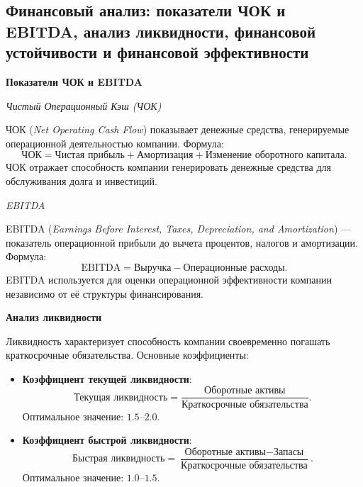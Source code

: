 \pagebreak
\subsection{Финансовый анализ: показатели ЧОК и EBITDA, анализ ликвидности, финансовой устойчивости и финансовой эффективности}

\textbf{Показатели ЧОК и EBITDA}

\textit{Чистый Операционный Кэш (ЧОК)}

ЧОК (\textit{Net Operating Cash Flow}) показывает денежные средства, генерируемые операционной деятельностью компании. Формула:
\begin{equation}
    \text{ЧОК} = \text{Чистая прибыль} + \text{Амортизация} + \text{Изменение оборотного капитала}.
\end{equation}
ЧОК отражает способность компании генерировать денежные средства для обслуживания долга и инвестиций.

\textit{EBITDA}

EBITDA (\textit{Earnings Before Interest, Taxes, Depreciation, and Amortization}) --- показатель операционной прибыли до вычета процентов, налогов и амортизации. Формула:
\begin{equation}
    \text{EBITDA} = \text{Выручка} - \text{Операционные расходы}.
\end{equation}
EBITDA используется для оценки операционной эффективности компании независимо от её структуры финансирования.

\textbf{Анализ ликвидности}

Ликвидность характеризует способность компании своевременно погашать краткосрочные обязательства. Основные коэффициенты:
\begin{itemize}
    \item \textbf{Коэффициент текущей ликвидности}:
    \begin{equation}
        \text{Текущая ликвидность} = \frac{\text{Оборотные активы}}{\text{Краткосрочные обязательства}}.
    \end{equation}
    Оптимальное значение: $1.5$–$2.0$.
    \item \textbf{Коэффициент быстрой ликвидности}:
    \begin{equation}
        \text{Быстрая ликвидность} = \frac{\text{Оборотные активы} - \text{Запасы}}{\text{Краткосрочные обязательства}}.
    \end{equation}
    Оптимальное значение: $1.0$–$1.5$.
\end{itemize}

